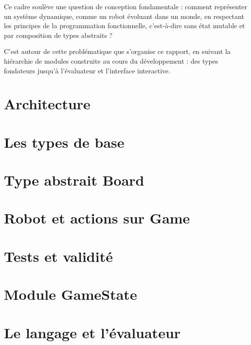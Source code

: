 \documentclass{article}
\begin{document}
Ce cadre soulève une question de conception fondamentale : comment représenter un système dynamique, comme un robot évoluant dans un monde, en respectant les principes de la programmation fonctionnelle, c'est-à-dire sans état mutable et par composition de types abstraits ?

C'est autour de cette problématique que s'organise ce rapport, en suivant la hiérarchie de modules construite au cours du développement : des types fondateurs jusqu'à l'évaluateur et l'interface interactive.

\tableofcontents

\section{Architecture}



\section{Les types de base}



\section{Type abstrait Board}



\section{Robot et actions sur Game}



\section{Tests et validité}



\section{Module GameState}



\section{Le langage et l'évaluateur}


\end{document}
